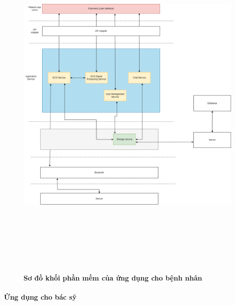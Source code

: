\begin{figure}[H]
  \centering
  \includegraphics[width=16cm,height=18cm]{Images/system/fmECG_architecture-Patient.drawio.png}
  \caption[Sơ đồ khối phần mềm của ứng dụng cho bệnh nhân]{\bfseries \fontsize{12pt}{0pt}\selectfont Sơ đồ khối phần mềm của ứng dụng cho bệnh nhân}
  \label{fmECG_architecture-Patient} %
\end{figure}

\paragraph{Ứng dụng cho bác sỹ}
\mbox{}


